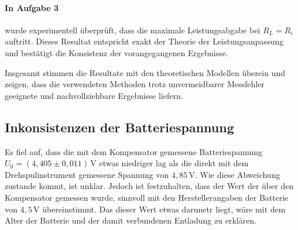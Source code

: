 \paragraph{In Aufgabe 3} wurde experimentell überprüft, dass die maximale Leistungsabgabe bei $R_L = R_i$ auftritt. Dieses Resultat entspricht exakt der Theorie der Leistungsanpassung und bestätigt die Konsistenz der vorangegangenen Ergebnisse. 

Insgesamt stimmen die Resultate mit den theoretischen Modellen überein und zeigen, dass die verwendeten Methoden trotz unvermeidbarer Messfehler geeignete und nachvollziehbare Ergebnisse liefern.

\subsection*{Inkonsistenzen der Batteriespannung}
Es fiel auf, dass die mit dem Kompensator gemessene Batteriespannung $U_0 = (4,405 \pm 0,011)\,\text{V}$ etwas niedriger lag als die direkt mit dem Drehspulinstrument gemessene Spannung von $4,85\,\text{V}$. Wie diese Abweichung zustande kommt, ist unklar. Jedoch ist festzuhalten, dass der Wert der über den Kompensator gemessen wurde, sinnvoll mit den Herstellerangaben der Batterie von $4,5\,\text{V}$ übereinstimmt. Das dieser Wert etwas darunetr liegt, wäre mit dem Alter der Batterie und der damit verbundenen Entladung zu erklären.